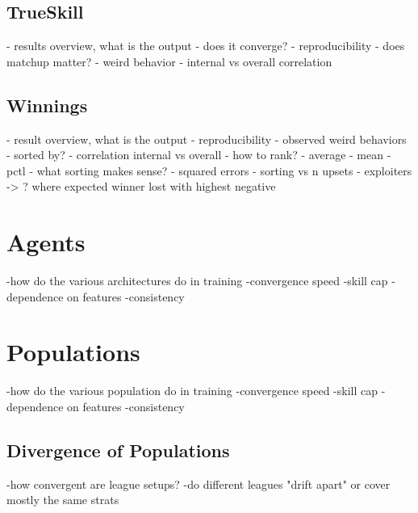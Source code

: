 \subsection{TrueSkill}
- results overview, what is the output
- does it converge?
- reproducibility
- does matchup matter?
- weird behavior
- internal vs overall correlation


\subsection{Winnings}
- result overview, what is the output
- reproducibility
- observed weird behaviors
- sorted by?
- correlation internal vs overall
- how to rank?
 - average
 - mean
 - pctl
- what sorting makes sense?
 - squared errors
- sorting vs n upsets
- exploiters -> ? where expected winner lost with highest negative


\section{Agents}
-how do the various architectures do in training
    -convergence speed
    -skill cap
    -dependence on features
    -consistency

\section{Populations}
-how do the various population do in training
    -convergence speed
    -skill cap
    -dependence on features
    -consistency

\subsection{Divergence of Populations}
-how convergent are league setups?
    -do different leagues "drift apart" or cover mostly the same strats